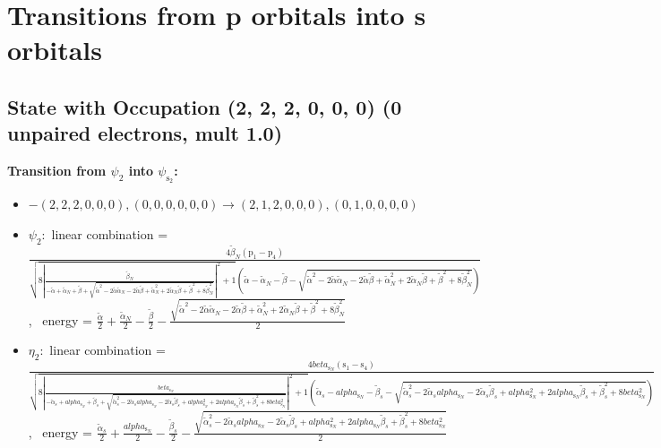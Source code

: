 \documentclass[12pt,a4paper]{article}
\begin{document}
\newpage \section*{Transitions from p orbitals into s orbitals}\subsection*{State with Occupation (2, 2, 2, 0, 0, 0) (0 unpaired electrons, mult 1.0)}
        \noindent\textbf{Transition from $\psi_{2}$ into $\psi_{\text{s}_{2}}$:}
        \begin{itemize}
            \item $- (2, 2, 2, 0, 0, 0), (0, 0, 0, 0, 0, 0) \rightarrow (2, 1, 2, 0, 0, 0), (0, 1, 0, 0, 0, 0)$
        
            \item $\psi_{2}:$ linear combination = $\frac{4 \tilde{\beta}_{N} \left(\text{p}_{1} - \text{p}_{4}\right)}{\sqrt{8 \left|{\frac{\tilde{\beta}_{N}}{- \tilde{\alpha} + \tilde{\alpha}_{N} + \tilde{\beta} + \sqrt{\tilde{\alpha}^{2} - 2 \tilde{\alpha} \tilde{\alpha}_{N} - 2 \tilde{\alpha} \tilde{\beta} + \tilde{\alpha}_{N}^{2} + 2 \tilde{\alpha}_{N} \tilde{\beta} + \tilde{\beta}^{2} + 8 \tilde{\beta}_{N}^{2}}}}\right|^{2} + 1} \left(\tilde{\alpha} - \tilde{\alpha}_{N} - \tilde{\beta} - \sqrt{\tilde{\alpha}^{2} - 2 \tilde{\alpha} \tilde{\alpha}_{N} - 2 \tilde{\alpha} \tilde{\beta} + \tilde{\alpha}_{N}^{2} + 2 \tilde{\alpha}_{N} \tilde{\beta} + \tilde{\beta}^{2} + 8 \tilde{\beta}_{N}^{2}}\right)}$, \
            energy = $\frac{\tilde{\alpha}}{2} + \frac{\tilde{\alpha}_{N}}{2} - \frac{\tilde{\beta}}{2} - \frac{\sqrt{\tilde{\alpha}^{2} - 2 \tilde{\alpha} \tilde{\alpha}_{N} - 2 \tilde{\alpha} \tilde{\beta} + \tilde{\alpha}_{N}^{2} + 2 \tilde{\alpha}_{N} \tilde{\beta} + \tilde{\beta}^{2} + 8 \tilde{\beta}_{N}^{2}}}{2}$
            
            \item $\eta_{2}:$ linear combination = $\frac{4 beta_{\text{s}_N} \left(\text{s}_{1} - \text{s}_{4}\right)}{\sqrt{8 \left|{\frac{beta_{\text{s}_N}}{- \tilde{\alpha}_{s} + alpha_{\text{s}_N} + \tilde{\beta}_{s} + \sqrt{\tilde{\alpha}_{s}^{2} - 2 \tilde{\alpha}_{s} alpha_{\text{s}_N} - 2 \tilde{\alpha}_{s} \tilde{\beta}_{s} + alpha_{\text{s}_N}^{2} + 2 alpha_{\text{s}_N} \tilde{\beta}_{s} + \tilde{\beta}_{s}^{2} + 8 beta_{\text{s}_N}^{2}}}}\right|^{2} + 1} \left(\tilde{\alpha}_{s} - alpha_{\text{s}_N} - \tilde{\beta}_{s} - \sqrt{\tilde{\alpha}_{s}^{2} - 2 \tilde{\alpha}_{s} alpha_{\text{s}_N} - 2 \tilde{\alpha}_{s} \tilde{\beta}_{s} + alpha_{\text{s}_N}^{2} + 2 alpha_{\text{s}_N} \tilde{\beta}_{s} + \tilde{\beta}_{s}^{2} + 8 beta_{\text{s}_N}^{2}}\right)}$, \
            energy = $\frac{\tilde{\alpha}_{s}}{2} + \frac{alpha_{\text{s}_N}}{2} - \frac{\tilde{\beta}_{s}}{2} - \frac{\sqrt{\tilde{\alpha}_{s}^{2} - 2 \tilde{\alpha}_{s} alpha_{\text{s}_N} - 2 \tilde{\alpha}_{s} \tilde{\beta}_{s} + alpha_{\text{s}_N}^{2} + 2 alpha_{\text{s}_N} \tilde{\beta}_{s} + \tilde{\beta}_{s}^{2} + 8 beta_{\text{s}_N}^{2}}}{2}$
            

\end{itemize}
\end{document}
